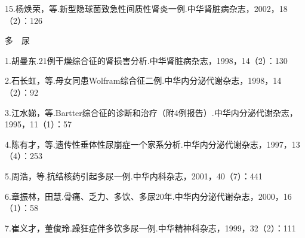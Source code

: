 15.杨焕荣，等.新型隐球菌致急性间质性肾炎一例.中华肾脏病杂志，2002，18（2）：126

多　尿

1.胡曼东.21例干燥综合征的肾损害分析.中华肾脏病杂志，1998，14（2）：130

2.石长虹，等.母女同患Wolfram综合征二例.中华内分泌代谢杂志，1998，14（2）：92

3.江水娣，等.Bartter综合征的诊断和治疗（附4例报告）.中华内分泌代谢杂志，1995，11（1）：57

4.陈有才，等.遗传性垂体性尿崩症一个家系分析.中华内分泌代谢杂志，1997，13（4）：253

5.周浩，等.抗结核药引起多尿一例.中华内科杂志，2001，40（7）：441

6.章振林，田慧.骨痛、乏力、多饮、多尿20年.中华内分泌代谢杂志，2000，16（1）：58

7.崔义才，董俊玲.躁狂症伴多饮多尿一例.中华精神科杂志，1999，32（2）：111

\protect\hypertarget{text00275.html}{}{}

